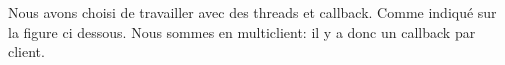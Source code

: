\documentclass[11pt,dvipsnames,svgnames]{report}
\begin{document}
%
%
%
%
%

Nous avons choisi de travailler avec des threads et callback. Comme indiqué sur la figure ci dessous. Nous sommes en multiclient: il y a donc un callback par client.
\end{document}
